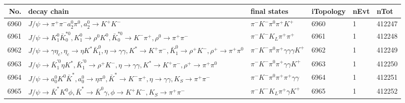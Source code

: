 \begin{table}[htbp] 
\begin{center}
\begin{small}
\begin{tabular}{rlllll}\hline\hline
 No. & decay chain & final states &  iTopology & nEvt & nTot \\\hline
6960&$J/\psi       \rightarrow \pi^{+}        \pi^{-}        a_{2}^{0}      \pi^{0}        , a_{2}^{0}       \rightarrow K^{+}          K^{-}          $&$\pi^{-}        K^{-}          \pi^{0}        \pi^{+}        K^{+}          $& 6960&    1&412247\\
6961&$J/\psi       \rightarrow K_1^{0}        \bar{K}_0^{*0}, K_1^{0}         \rightarrow \rho^{0}      K^{0}          , \bar{K}_0^{*0} \rightarrow K^{-}          \pi^{+}        , \rho^{0}       \rightarrow \pi^{+}        \pi^{-}        $&$\pi^{-}        K^{-}          K_{L}          \pi^{+}        \pi^{+}        $& 6961&    1&412248\\
6962&$J/\psi       \rightarrow \gamma       \eta_{c}    , \eta_{c}     \rightarrow \eta          K^{*}          \bar{K}_1^{0} , \eta           \rightarrow \gamma       \gamma       , K^{*}           \rightarrow K^{+}          \pi^{-}        , \bar{K}_1^{0}  \rightarrow \rho^{+}      K^{-}          , \rho^{+}       \rightarrow \pi^{+}        \pi^{0}        $&$\pi^{-}        K^{-}          \pi^{0}        \pi^{+}        \gamma       \gamma       \gamma       K^{+}          $& 6962&    1&412249\\
6963&$J/\psi       \rightarrow \bar{K}_1^{'0}\eta          K^{*}          , \bar{K}_1^{'0} \rightarrow \rho^{+}      K^{-}          , \eta           \rightarrow \gamma       \gamma       , K^{*}           \rightarrow K^{+}          \pi^{-}        , \rho^{+}       \rightarrow \pi^{+}        \pi^{0}        $&$\pi^{-}        K^{-}          \pi^{0}        \pi^{+}        \gamma       \gamma       K^{+}          $& 6963&    1&412250\\
6964&$J/\psi       \rightarrow a_{0}^{0}      K^{0}          \bar{K}^{*}   , a_{0}^{0}       \rightarrow \eta          \pi^{0}        , \bar{K}^{*}    \rightarrow K^{-}          \pi^{+}        , \eta           \rightarrow \gamma       \gamma       , K_{S}           \rightarrow \pi^{+}        \pi^{-}        $&$\pi^{-}        K^{-}          \pi^{0}        \pi^{+}        \pi^{+}        \gamma       \gamma       $& 6964&    1&412251\\
6965&$J/\psi       \rightarrow \bar{K}^{*}   K^{0}          \phi           , \bar{K}^{*}    \rightarrow \bar{K}^{0}   \gamma       , \phi            \rightarrow K^{+}          K^{-}          , K_{S}           \rightarrow \pi^{+}        \pi^{-}        $&$\pi^{-}        K^{-}          K_{L}          \pi^{+}        \gamma       K^{+}          $& 6965&    1&412252\\

\end{tabular}
\end{small}
\end{center}
\end{table}
